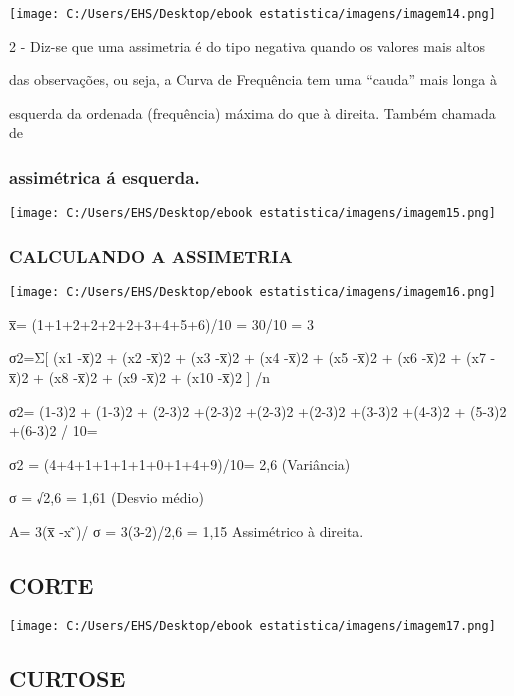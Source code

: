 \documentclass[]{book}
\begin{document}
\texttt{[image: C:/Users/EHS/Desktop/ebook estatistica/imagens/imagem14.png]}

2 - Diz-se que uma assimetria é do tipo negativa quando os valores mais altos

das observações, ou seja, a Curva de Frequência tem uma ``cauda'' mais longa à

esquerda da ordenada (frequência) máxima do que à direita. Também chamada de

\hypertarget{assimetrica-a-esquerda.}{%
\subsubsection{assimétrica á esquerda.}\label{assimetrica-a-esquerda.}}

\texttt{[image: C:/Users/EHS/Desktop/ebook estatistica/imagens/imagem15.png]}

\hypertarget{calculando-a-assimetria}{%
\subsubsection{CALCULANDO A ASSIMETRIA}\label{calculando-a-assimetria}}

\texttt{[image: C:/Users/EHS/Desktop/ebook estatistica/imagens/imagem16.png]}

x̅= (1+1+2+2+2+2+3+4+5+6)/10 = 30/10 = 3

σ2=Σ{[} (x1 -x̅)2 + (x2 -x̅)2 + (x3 -x̅)2 + (x4 -x̅)2 + (x5 -x̅)2 + (x6 -x̅)2 + (x7 -x̅)2 + (x8 -x̅)2 + (x9 -x̅)2 + (x10 -x̅)2 {]} /n

σ2= (1-3)2 + (1-3)2 + (2-3)2 +(2-3)2 +(2-3)2 +(2-3)2 +(3-3)2 +(4-3)2 + (5-3)2 +(6-3)2 / 10=

σ2 = (4+4+1+1+1+1+0+1+4+9)/10= 2,6 (Variância)

σ = √2,6 = 1,61 (Desvio médio)

A= 3(x̅ -x ̃)/ σ = 3(3-2)/2,6 = 1,15 Assimétrico à direita.

\hypertarget{corte}{%
\subsection{CORTE}\label{corte}}

\texttt{[image: C:/Users/EHS/Desktop/ebook estatistica/imagens/imagem17.png]}

\hypertarget{curtose}{%
\subsection{CURTOSE}\label{curtose}}
\end{document}
